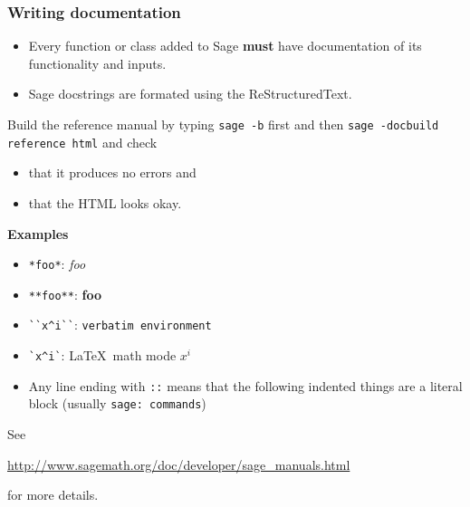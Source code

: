 \documentclass[11pt,blackandwhite]{beamer}
\renewcommand{\emph}[1]{{\color{black}\bf #1}}
\newcommand{\code}{\lstinline}
\begin{document}
\begin{frame}[allowframebreaks]
\frametitle{Writing documentation}
\begin{itemize}
 \item Every function or class added to Sage \emph{must} have documentation of
its functionality and inputs.
 \item Sage docstrings are formated using the ReStructuredText.
\end{itemize}

Build the reference manual by typing \texttt{sage -b} first and then
\texttt{sage -docbuild reference html} and check

\begin{itemize}
 \item that it produces no errors and
 \item that the HTML looks okay.
\end{itemize}

\framebreak

\emph{Examples}
\begin{itemize} 
 \item \code{*foo*}: \textit{foo}
 \item \code{**foo**}: \textbf{foo}
 \item \code{``x^i``}: \texttt{verbatim environment}
 \item \code{`x^i`}: \LaTeX\ math mode $x^i$
 \item Any line ending with \texttt{::} means that the following indented
things are a literal block (usually \texttt{sage: commands})
\end{itemize}

See 

\begin{center}
\url{http://www.sagemath.org/doc/developer/sage_manuals.html}
\end{center}

for more details.

\end{frame}
\end{document}
